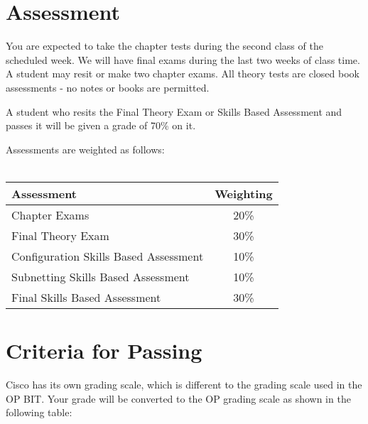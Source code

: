 \documentclass{article}
\begin{document}
\newpage 

\section*{Assessment}
You are expected to take the chapter tests during the second class of the scheduled week. We
will have final exams during the last two weeks of class time.  A student may resit or make two
chapter exams. All theory tests are closed book assessments - no notes or books are permitted.

A student who resits the Final Theory Exam or Skills Based Assessment and passes it will be given 
a grade of 70\% on it.

Assessments are weighted as follows: 
\\
\\
\begin{tabular}{|l|c|}
\hline
Assessment                             &  Weighting \\ \hline
Chapter Exams                          &  20\% \\ \hline
Final Theory Exam                      &  30\% \\ \hline
Configuration Skills Based Assessment  &  10\% \\ \hline
Subnetting Skills Based Assessment     &  10\% \\ \hline
Final Skills Based Assessment          &  30\% \\ \hline
\end{tabular}

\section*{Criteria for Passing}
Cisco has its own grading scale, which is different to the grading scale used in the OP BIT. Your grade will be converted to the OP grading scale as shown in the following table:
\\
\end{document}
